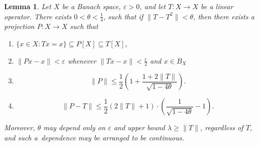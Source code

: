 \documentclass[12pt,fleqn]{amsart}
\renewcommand{\leq}{\leqslant}
\renewcommand{\geq}{\geqslant}
\newtheorem{lemma}[theorem]{Lemma}
\theoremstyle{definition}
\theoremstyle{remark}
\begin{document}
\begin{lemma}\label{lem:cas}
    Let \( X \) be a Banach space, $\varepsilon>0$, and let \( T \colon X \to X \) be a linear operator. There exists \(0<\theta < \frac{1}{4}\), such that if $ \|T - T^2\|< \theta$, then there exists a projection \( P \colon X \to X \) such that 
    \begin{enumerate}[label=\roman*)]
    \item \(\{x \in X \colon Tx = x\} \subseteq P[X] \subseteq T[X]
    \), 
    \item \(\|Px-x\|<\varepsilon\) whenever \(\|Tx-x\|<\frac{\varepsilon}{2}\) and \(x\in B_X\)
    \item {}
    \[
        \|P\| \leqslant \frac{1}{2} \left( 1 + \frac{1 + 2\|T\|}{\sqrt{1 - 4\theta}} \right).
    \]
    \item\label{eq:PTestimate} 
    \[
        \|P-T\|\leq \frac{1}{2}(2\|T\|+1)\cdot \left(\frac{1}{\sqrt{1-4\theta}} - 1 \right).
    \]
    \end{enumerate}
    Moreover, $\theta$ may depend only on $\varepsilon$ and upper bound $\lambda \geq\|T\|$, regardless of $T$, and such a~dependence may be arranged to be continuous.
\end{lemma}
\end{document}
